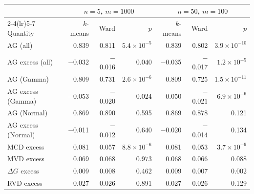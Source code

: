 \begin{tabular}{lrrrrrr}
\toprule
 & \multicolumn{3}{c}{$n = 5$, $m = 1000$} & \multicolumn{3}{c}{$n = 50$, $m = 100$} \\
\cmidrule(lr){2-4}\cmidrule(lr){5-7}
Quantity & $k$-means & Ward & $p$ & $k$-means & Ward & $p$ \\
\midrule
AG (all) & 0.839 & 0.811 & $5.4\times10^{-5}$ & 0.839 & 0.802 & $3.9\times10^{-10}$ \\
AG excess (all) & $-$0.032 & $-$0.016 & 0.040 & $-$0.035 & $-$0.017 & $1.2\times10^{-5}$ \\
AG (Gamma) & 0.809 & 0.731 & $2.6\times10^{-6}$ & 0.809 & 0.725 & $1.5\times10^{-11}$ \\
AG excess (Gamma) & $-$0.053 & $-$0.020 & 0.024 & $-$0.050 & $-$0.021 & $6.9\times10^{-6}$ \\
AG (Normal) & 0.869 & 0.890 & 0.595 & 0.869 & 0.878 & 0.121 \\
AG excess (Normal) & $-$0.011 & $-$0.012 & 0.640 & $-$0.020 & $-$0.014 & 0.134 \\
\addlinespace
MCD excess & 0.081 & 0.057 & $8.8\times10^{-6}$ & 0.081 & 0.053 & $3.7\times10^{-9}$ \\
MVD excess & 0.069 & 0.068 & 0.973 & 0.068 & 0.066 & 0.088 \\
$\Delta G$ excess & 0.009 & 0.008 & 0.462 & 0.009 & 0.007 & 0.002 \\
RVD excess & 0.027 & 0.026 & 0.891 & 0.027 & 0.026 & 0.129 \\
\bottomrule
\end{tabular}
